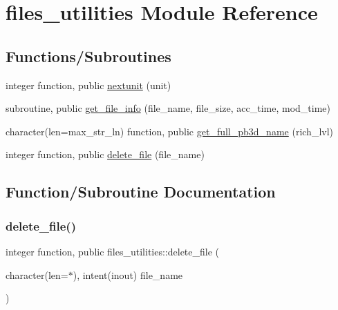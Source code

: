 \hypertarget{namespacefiles__utilities}{}\section{files\+\_\+utilities Module Reference}
\label{namespacefiles__utilities}
\subsection*{Functions/\+Subroutines}
\begin{DoxyCompactItemize}
\item 
integer function, public \hyperlink{namespacefiles__utilities_ac6066df405564ba2f5e3c4bba726c1f8}{nextunit} (unit)
\item 
subroutine, public \hyperlink{namespacefiles__utilities_a07f2e430ff33c1e291731ad64c1fe482}{get\+\_\+file\+\_\+info} (file\+\_\+name, file\+\_\+size, acc\+\_\+time, mod\+\_\+time)
\item 
character(len=max\+\_\+str\+\_\+ln) function, public \hyperlink{namespacefiles__utilities_a43f1c2b7e128b1b2cdbcdb8963daab0e}{get\+\_\+full\+\_\+pb3d\+\_\+name} (rich\+\_\+lvl)
\item 
integer function, public \hyperlink{namespacefiles__utilities_a083c08dfd3919fa2a1df01507fe431af}{delete\+\_\+file} (file\+\_\+name)
\end{DoxyCompactItemize}


\subsection{Function/\+Subroutine Documentation}
\mbox{\label{namespacefiles__utilities_a083c08dfd3919fa2a1df01507fe431af}} 
\subsubsection{\texorpdfstring{delete\+\_\+file()}{delete\_file()}}
{\footnotesize\ttfamily integer function, public files\+\_\+utilities\+::delete\+\_\+file (\begin{DoxyParamCaption}\item[{character(len=$\ast$), intent(inout)}]{file\+\_\+name }\end{DoxyParamCaption})}



